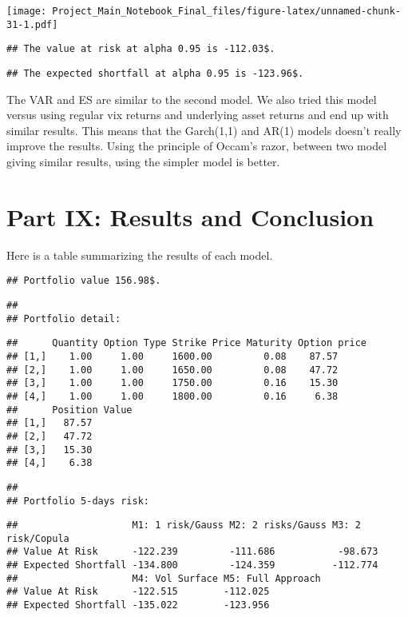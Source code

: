 \documentclass[]{article}
\begin{document}
\texttt{[image: Project\_Main\_Notebook\_Final\_files/figure-latex/unnamed-chunk-31-1.pdf]}

\begin{verbatim}
## The value at risk at alpha 0.95 is -112.03$.
\end{verbatim}

\begin{verbatim}
## The expected shortfall at alpha 0.95 is -123.96$.
\end{verbatim}

The VAR and ES are similar to the second model. We also tried this model
versus using regular vix returns and underlying asset returns and end up
with similar results. This means that the Garch(1,1) and AR(1) models
doesn't really improve the results. Using the principle of Occam's
razor, between two model giving similar results, using the simpler model
is better.

\hypertarget{part-ix-results-and-conclusion}{%
\section{Part IX: Results and
Conclusion}\label{part-ix-results-and-conclusion}}

Here is a table summarizing the results of each model.

\begin{verbatim}
## Portfolio value 156.98$.
\end{verbatim}

\begin{verbatim}
## 
## Portfolio detail:
\end{verbatim}

\begin{verbatim}
##      Quantity Option Type Strike Price Maturity Option price
## [1,]    1.00     1.00     1600.00         0.08    87.57     
## [2,]    1.00     1.00     1650.00         0.08    47.72     
## [3,]    1.00     1.00     1750.00         0.16    15.30     
## [4,]    1.00     1.00     1800.00         0.16     6.38     
##      Position Value
## [1,]   87.57       
## [2,]   47.72       
## [3,]   15.30       
## [4,]    6.38
\end{verbatim}

\begin{verbatim}
## 
## Portfolio 5-days risk:
\end{verbatim}

\begin{verbatim}
##                    M1: 1 risk/Gauss M2: 2 risks/Gauss M3: 2 risk/Copula
## Value At Risk      -122.239         -111.686           -98.673         
## Expected Shortfall -134.800         -124.359          -112.774         
##                    M4: Vol Surface M5: Full Approach
## Value At Risk      -122.515        -112.025         
## Expected Shortfall -135.022        -123.956
\end{verbatim}
\end{document}
